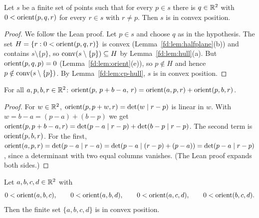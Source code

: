 \begin{lemma}\label{fd:lem:strict-supports}\sloppy
Let $s$ be a finite set of points such that for every $p\in s$ there is $q\in\mathbb R^2$ with
$0<\operatorname{orient}(p,q,r)$ for every $r\in s$ with $r\ne p$. Then $s$ is in convex position.
\end{lemma}

\begin{proof}
We follow the Lean proof. Let $p\in s$ and choose $q$ as in the hypothesis. The set
$H=\{r:0<\operatorname{orient}(p,q,r)\}$ is convex (Lemma~\ref{fd:lem:halfplane}(b)) and contains $s\setminus\{p\}$, so
$\operatorname{conv}(s\setminus\{p\})\subseteq H$ by Lemma~\ref{fd:lem:hull}(a). But $\operatorname{orient}(p,q,p)=0$
(Lemma~\ref{fd:lem:orient}(e)), so $p\notin H$ and hence $p\notin\operatorname{conv}(s\setminus\{p\})$. By
Lemma~\ref{fd:lem:cp-hull}, $s$ is in convex position.
\end{proof}

\begin{lemma}\label{fd:lem:support-sum}\sloppy
For all $a,p,b,r\in\mathbb R^2$: $\operatorname{orient}(p,\,p+b-a,\,r)=\operatorname{orient}(a,p,r)+\operatorname{orient}(p,b,r)$.
\end{lemma}

\begin{proof}
For $w\in\mathbb R^2$, $\operatorname{orient}(p,p+w,r)=\det(w\mid r-p)$ is linear in $w$. With $w=b-a=(p-a)+(b-p)$ we get
$\operatorname{orient}(p,p+b-a,r)=\det(p-a\mid r-p)+\det(b-p\mid r-p)$. The second term is $\operatorname{orient}(p,b,r)$. For the
first, $\operatorname{orient}(a,p,r)=\det(p-a\mid r-a)=\det(p-a\mid (r-p)+(p-a))=\det(p-a\mid r-p)$, since a determinant
with two equal columns vanishes. (The Lean proof expands both sides.)
\end{proof}

\begin{lemma}\label{fd:lem:four-positive}\sloppy
Let $a,b,c,d\in\mathbb R^2$ with
\[
  0<\operatorname{orient}(a,b,c),\qquad 0<\operatorname{orient}(a,b,d),\qquad 0<\operatorname{orient}(a,c,d),\qquad 0<\operatorname{orient}(b,c,d).
\]
Then the finite set $\{a,b,c,d\}$ is in convex position.
\end{lemma}

